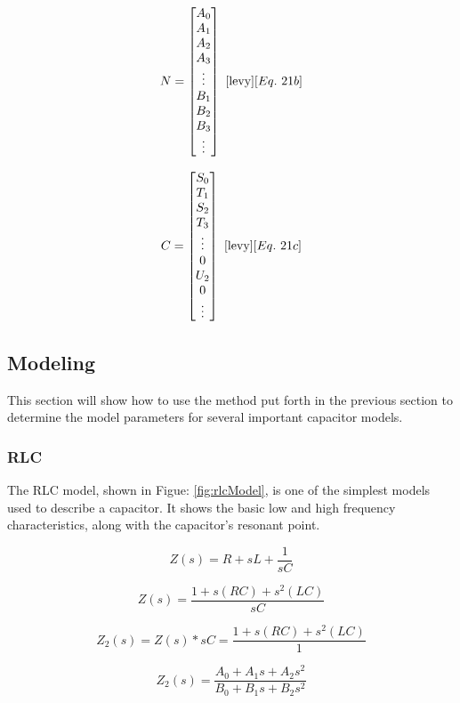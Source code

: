 \begin{multicols}{2}
\begin{equation}
\label{equ:Levy_N}
N = 
\begin{bmatrix}
A_0 \\
A_1 \\
A_2 \\
A_3 \\
\vdots \\
B_1 \\
B_2 \\
B_3 \\
\vdots
\end{bmatrix}
~\cite{levy}[Eq.~21b]
\end{equation}

\begin{equation}
\label{equ:Levy_C}
C = 
\begin{bmatrix}
S_0 \\
T_1 \\
S_2 \\
T_3 \\
\vdots \\
0   \\
U_2 \\
0   \\
\vdots
\end{bmatrix}
~\cite{levy}[Eq.~21c]
\end{equation}
\end{multicols}

\subsection{Modeling}
This section will show how to use the method put forth in the previous section to determine the model parameters for several important capacitor models.

\subsubsection{RLC}
The RLC model, shown in Figue: \ref{fig:rlcModel}, is one of the simplest models used to describe a capacitor. It shows the basic low and high frequency characteristics, along with the capacitor's resonant point.



\begin{equation}
\label{equ:rlc_Zs}
Z(s) = R + sL + \frac{1}{sC}
\end{equation}

\begin{equation}
\label{equ:rlc_Zs2}
Z(s) = \frac{1 + s(RC) + s^2 (LC)}{sC}
\end{equation}

\begin{equation}
\label{equ:rlc_Zs3}
Z_2(s) = Z(s) * sC =  \frac{1 + s(RC) + s^2 (LC)}{1}
\end{equation}

\begin{equation}
\label{equ:rlc_Zs4}
Z_2(s) = \frac{A_0 + A_1 s + A_2 s^2}{B_0 + B_1 s + B_2 s^2}
\end{equation}

